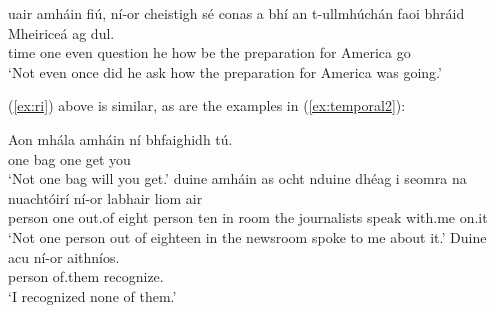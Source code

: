 \documentclass[output=paper,colorlinks,citecolor=brown]{langscibook}
\begin{document}
\ea\label{ex:temporal}
\gll uair amháin fiú, ní-or cheistigh sé conas a bhí an t-ullmhúchán {faoi bhráid} Mheiriceá ag dul. \\
    time one even {\nior} {question\past} he how {\C} {be\past} the preparation for America {\prog} {go\vn}\\ \label{ex:uair}
\glt `Not even once did he ask how the preparation for America was going.'\\ \hfill{}
\z


\noindent (\ref{ex:ri}) above is similar, as are the examples in (\ref{ex:temporal2}):

\ea\label{ex:temporal2}
\ea
\gll Aon mhála amháin ní bhfaighidh tú. \\
     one bag one {\no} {get\fut} you\\
\glt `Not one bag will you get.'
\ex
\gll duine amháin as ocht nduine dhéag i seomra na nuachtóirí ní-or labhair liom air \\
     person one out.of eight person ten in room the journalists {\nior} {speak\past} with.me on.it \\
\glt `Not one person out of eighteen in the newsroom spoke to me about it.' 
\ex
\gll Duine acu ní-or aithníos. \\
     person of.them {\nior} {recognize\past.\my}\\
\glt `I recognized none of them.'
\z
\z

\end{document}
